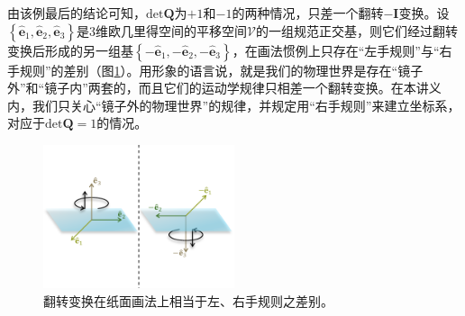 \documentclass[main.tex]{subfiles}
\begin{document}
由该例最后的结论可知，$\mathrm{det}\mathbf{Q}$为$+1$和$-1$的两种情况，只差一个翻转$-\mathbf{I}$变换。设$\left\{\mathbf{\hat{e}}_1,\mathbf{\hat{e}}_2,\mathbf{\hat{e}}_3\right\}$是3维欧几里得空间的平移空间$\mathcal{V}$的一组规范正交基，则它们经过翻转变换后形成的另一组基$\left\{-\mathbf{\hat{e}}_1,-\mathbf{\hat{e}}_2,-\mathbf{\hat{e}}_3\right\}$，在画法惯例上只存在“左手规则”与“右手规则”的差别（图\ref{fig:II.3.3}）。用形象的语言说，就是我们的物理世界是存在“镜子外”和“镜子内”两套的，而且它们的运动学规律只相差一个翻转变换。在本讲义内，我们只关心“镜子外的物理世界”的规律，并规定用“右手规则”来建立坐标系，对应于$\mathrm{det}\mathbf{Q}=1$的情况。

\begin{figure}[h]
    \centering
    \includegraphics[width=0.5\textwidth]{images/II.3.3.pdf}
    \caption{翻转变换在纸面画法上相当于左、右手规则之差别。}
    \label{fig:II.3.3}
\end{figure}
\end{document}
